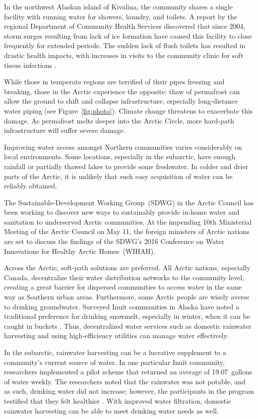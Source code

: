 \documentclass[american]{../../../coursework}
\begin{document}
In the northwest Alaskan island of Kivalina, the community shares a single
facility with running water for showers, laundry, and toilets. A report by the
regional Department of Community Health Services discovered that since 2004,
storm surges resulting from lack of ice formation have caused this facility to
close frequently for extended periods. The sudden lack of flush toilets has
resulted in drastic health impacts, with increases in visits to the community
clinic for soft tissue infections \parencite{Thomas2013}.

While those in temperate regions are terrified of their pipes freezing and
breaking, those in the Arctic experience the opposite: thaw of permafrost can
allow the ground to shift and collapse infrastructure, especially
long-distance water piping (see Figure~\ref{fig:photo}). Climate change
threatens to exacerbate this damage. As permafrost melts deeper into the
Arctic Circle, more hard-path infrastructure will suffer severe damage.

Improving water access amongst Northern communities varies considerably on
local environments. Some locations, especially in the subarctic, have enough
rainfall or partially thawed lakes to provide some freshwater. In colder and
drier parts of the Arctic, it is unlikely that such easy acquisition of water
can be reliably obtained.

The Sustainable-Development Working Group~(SDWG) in the Arctic Council has
been working to discover new ways to sustainably provide in-home water and
sanitation to underserved Arctic communities. At the impending 10th
Ministerial Meeting of the Arctic Council on May 11, the foreign ministers of
Arctic nations are set to discuss the findings of the SDWG's 2016 Conference
on Water Innovations for Healthy Arctic Homes~(WIHAH).

Across the Arctic, soft-path solutions are preferred. All Arctic nations,
especially Canada, decentralize their water distribution networks to the
community level, creating a great barrier for dispersed communities to access
water in the same way as Southern urban areas. Furthermore, some Arctic people
are wisely averse to drinking groundwater. Surveyed Inuit communities in
Alaska have noted a traditional preference for drinking snowmelt, especially
in winter, when it can be caught in buckets \parencite{Dotson2016}. Thus,
decentralized water services such as domestic rainwater harvesting and using
high-efficiency utilities can manage water effectively.

In the subarctic, rainwater harvesting can be a lucrative supplement to a
community's current source of water. In one particular Inuit community,
researchers implemented a pilot scheme that returned an average of
19.07~gallons of water weekly. The researchers noted that the rainwater was
not potable, and as such, drinking water did not increase; however, the
participants in the program testified that they felt healthier
\parencite{Mercer2017}. With improved water filtration, domestic rainwater
harvesting can be able to meet drinking water needs as well.
\end{document}
